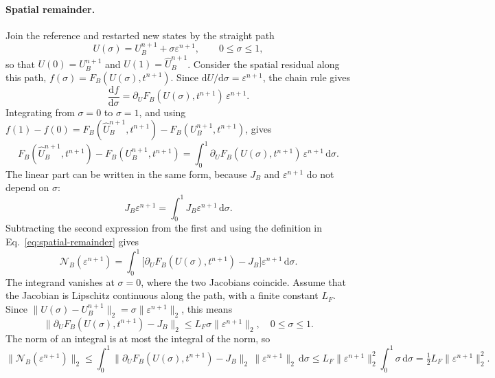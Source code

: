 \documentclass[a4paper,fleqn]{cas-sc}
\newcommand{\dd}{\,\mathrm{d}}
\newcommand{\eps}{\varepsilon}
\begin{document}
\paragraph{Spatial remainder.}
Join the reference and restarted new states by the straight path
\[
 U(\sigma)=U_B^{n+1}+\sigma\eps^{n+1},\qquad 0\leq\sigma\leq1,
\]
so that $U(0)=U_B^{n+1}$ and $U(1)=\widehat U_B^{n+1}$. Consider the spatial residual along this path, $f(\sigma)=F_B(U(\sigma),t^{n+1})$. Since $\mathrm dU/\mathrm d\sigma=\eps^{n+1}$, the chain rule gives
\[
 \frac{\mathrm df}{\mathrm d\sigma}=\partial_U F_B(U(\sigma),t^{n+1})\,\eps^{n+1}.
\]
Integrating from $\sigma=0$ to $\sigma=1$, and using $f(1)-f(0)=F_B(\widehat U_B^{n+1},t^{n+1})-F_B(U_B^{n+1},t^{n+1})$, gives
\[
 F_B(\widehat U_B^{n+1},t^{n+1})-F_B(U_B^{n+1},t^{n+1})
 =\int_0^1\partial_U F_B(U(\sigma),t^{n+1})\,\eps^{n+1}\dd\sigma.
\]
The linear part can be written in the same form, because $J_B$ and $\eps^{n+1}$ do not depend on $\sigma$:
\[
 J_B\eps^{n+1}=\int_0^1J_B\eps^{n+1}\dd\sigma.
\]
Subtracting the second expression from the first and using the definition in Eq.~\eqref{eq:spatial-remainder} gives
\[
 \mathcal N_B(\eps^{n+1})
 =\int_0^1\big[\partial_U F_B(U(\sigma),t^{n+1})-J_B\big]\eps^{n+1}\dd\sigma.
\]
The integrand vanishes at $\sigma=0$, where the two Jacobians coincide. Assume that the Jacobian is Lipschitz continuous along the path, with a finite constant $L_F$. Since $\|U(\sigma)-U_B^{n+1}\|_2=\sigma\|\eps^{n+1}\|_2$, this means
\begin{equation}
 \|\partial_U F_B(U(\sigma),t^{n+1})-J_B\|_2
 \leq L_F\sigma\|\eps^{n+1}\|_2,
 \quad 0\leq\sigma\leq1.
 \label{eq:jacobian-variation-bound}
\end{equation}
The norm of an integral is at most the integral of the norm, so
\begin{equation}
 \|\mathcal N_B(\eps^{n+1})\|_2
 \leq\int_0^1\|\partial_U F_B(U(\sigma),t^{n+1})-J_B\|_2\,\|\eps^{n+1}\|_2\dd\sigma
 \leq L_F\|\eps^{n+1}\|_2^2\int_0^1\sigma\dd\sigma
 =\tfrac12 L_F\|\eps^{n+1}\|_2^2.
 \label{eq:spatial-remainder-bound}
\end{equation}
\end{document}
